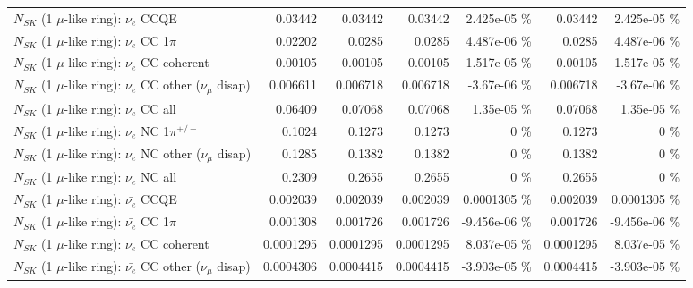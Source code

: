 \begin{table}
\begin{tabular}{| l | r | r | r  r | r  r |}
\hline
\hline
\hline
                                      $N_{SK}$ (1 $\mu$-like ring): $\nu_e$ CCQE &         0.03442 &         0.03442 &         0.03442 & 2.425e-05 \%  &         0.03442 & 2.425e-05 \%  \\ 
                                 $N_{SK}$ (1 $\mu$-like ring): $\nu_e$ CC 1$\pi$ &         0.02202 &          0.0285 &          0.0285 & 4.487e-06 \%  &          0.0285 & 4.487e-06 \%  \\ 
                               $N_{SK}$ (1 $\mu$-like ring): $\nu_e$ CC coherent &         0.00105 &         0.00105 &         0.00105 & 1.517e-05 \%  &         0.00105 & 1.517e-05 \%  \\ 
                $N_{SK}$ (1 $\mu$-like ring): $\nu_e$ CC other ($\nu_\mu$ disap) &        0.006611 &        0.006718 &        0.006718 & -3.67e-06 \%  &        0.006718 & -3.67e-06 \%  \\ 
                                  $N_{SK}$ (1 $\mu$-like ring): $\nu_{e}$ CC all &         0.06409 &         0.07068 &         0.07068 & 1.35e-05 \%  &         0.07068 & 1.35e-05 \%  \\ 
\hline
                           $N_{SK}$ (1 $\mu$-like ring): $\nu_e$ NC 1$\pi^{+/-}$ &          0.1024 &          0.1273 &          0.1273 &        0 \%  &          0.1273 &        0 \%  \\ 
                $N_{SK}$ (1 $\mu$-like ring): $\nu_e$ NC other ($\nu_\mu$ disap) &          0.1285 &          0.1382 &          0.1382 &        0 \%  &          0.1382 &        0 \%  \\ 
                                  $N_{SK}$ (1 $\mu$-like ring): $\nu_{e}$ NC all &          0.2309 &          0.2655 &          0.2655 &        0 \%  &          0.2655 &        0 \%  \\ 
\hline
\hline
\hline
                                $N_{SK}$ (1 $\mu$-like ring): $\bar{\nu_e}$ CCQE &        0.002039 &        0.002039 &        0.002039 & 0.0001305 \%  &        0.002039 & 0.0001305 \%  \\ 
                           $N_{SK}$ (1 $\mu$-like ring): $\bar{\nu_e}$ CC 1$\pi$ &        0.001308 &        0.001726 &        0.001726 & -9.456e-06 \%  &        0.001726 & -9.456e-06 \%  \\ 
                         $N_{SK}$ (1 $\mu$-like ring): $\bar{\nu_e}$ CC coherent &       0.0001295 &       0.0001295 &       0.0001295 & 8.037e-05 \%  &       0.0001295 & 8.037e-05 \%  \\ 
          $N_{SK}$ (1 $\mu$-like ring): $\bar{\nu_e}$ CC other ($\nu_\mu$ disap) &       0.0004306 &       0.0004415 &       0.0004415 & -3.903e-05 \%  &       0.0004415 & -3.903e-05 \%  \\ 

\end{tabular}
\end{table}
